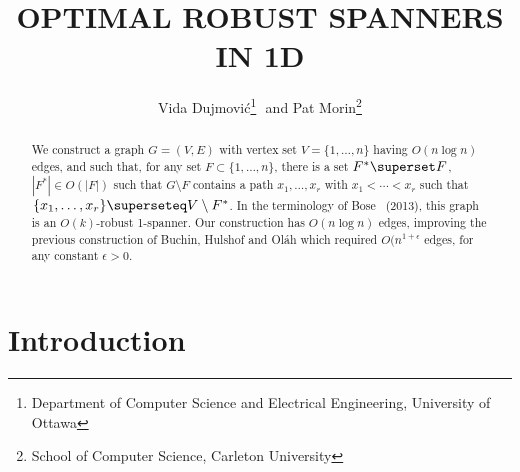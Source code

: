 \documentclass{patmorin}
\title{\MakeUppercase{Optimal Robust Spanners in 1D}}
\author{Vida Dujmovi\'c\thanks{Department of Computer Science and Electrical Engineering, University of Ottawa}\,\, and 
        Pat Morin\thanks{School of Computer Science, Carleton University}}
\begin{document}
\maketitle


\begin{abstract}
  We construct a graph $G=(V,E)$ with vertex set $V=\{1,\ldots,n\}$
  having $O(n\log n)$ edges, and
  such that, for any set $F\subset\{1,\ldots,n\}$, there is a
  set $F^*\superset F$, $|F^*|\in O(|F|)$ such that $G\setminus
  F$ contains a path $x_1,\ldots,x_r$ with $x_1<\cdots<x_r$ such that
  $\{x_1,\ldots,x_r\}\superseteq V\setminus F^*$.
  In the terminology of Bose \etal\ (2013), this graph is an $O(k)$-robust 1-spanner.  
  Our construction has $O(n\log n)$ edges, improving the previous construction of Buchin, Hulshof and Ol\'ah \cite{buchin.hulshof.ea:robust} which required $O(n^{1+\epsilon}$ edges, for any constant $\epsilon >0$. 
\end{abstract}

\section{Introduction}




\end{document}
